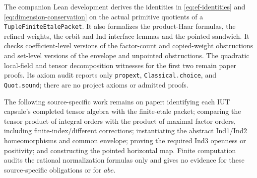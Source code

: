 The companion Lean development derives the identities in
\eqref{eq:ef-identities} and \eqref{eq:dimension-conservation} on the actual
primitive quotients of a \texttt{TupleFiniteEtalePacket}.  It also formalizes
the product-Haar formulas, the refined weights, the orbit and Ind interface
lemmas and the pointed sandwich.  It checks coefficient-level versions of the
factor-count and copied-weight obstructions and set-level versions of the
envelope and unpointed obstructions.  The quadratic local-field and tensor
decomposition witnesses for the first two remain paper proofs.  Its axiom
audit reports only \texttt{propext}, \texttt{Classical.choice}, and
\texttt{Quot.sound}; there are no project axioms or admitted proofs.

The following source-specific work remains on paper: identifying each IUT
capsule's completed tensor algebra with the finite-etale packet; comparing
the tensor product of integral orders with the product of maximal factor
orders, including finite-index/different corrections; instantiating the
abstract Ind1/Ind2 homeomorphisms and common envelope; proving the required
Ind3 openness or positivity; and constructing the pointed horizontal map.
Finite computation audits the rational normalization formulas only and gives
no evidence for these source-specific obligations or for $abc$.
